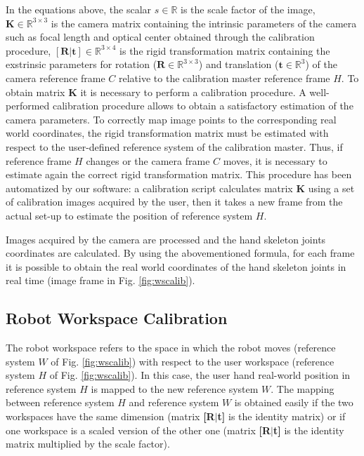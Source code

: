 \documentclass[letterpaper, 10 pt, conference]{ieeeconf}  %
\begin{document}
In the equations above, the scalar $s\in\mathbb{R}$ is the scale factor of the image, $\mathbf{K}\in\mathbb{R}^{3\times3}$ is the camera matrix containing the intrinsic parameters of the camera such as focal length and optical center obtained through the calibration procedure, $\mathbf{[R|t]}\in\mathbb{R}^{3\times4}$ is the rigid transformation matrix containing the exstrinsic parameters for rotation ($\mathbf{R}\in\mathbb{R}^{3\times3}$) and translation ($\mathbf{t}\in\mathbb{R}^3$) of the camera reference frame $C$ relative to the calibration master reference frame $H$. 
To obtain matrix \textbf{K} it is necessary to perform a calibration procedure. A well-performed calibration procedure allows to obtain a satisfactory estimation of the camera parameters. To correctly map image points to the corresponding real world coordinates, the rigid transformation matrix must be estimated with respect to the user-defined reference system of the calibration master. Thus, if reference frame $H$ changes or the camera frame $C$ moves, it is necessary to estimate again the correct rigid transformation matrix. This procedure has been automatized by our software: a calibration script calculates matrix \textbf{K} using a set of calibration images acquired by the user, then it takes a new frame from the actual set-up to estimate the position of reference system $H$.

Images acquired by the camera are processed and the hand skeleton joints coordinates are calculated. By using the abovementioned formula, for each frame it is possible to obtain the real world coordinates of the hand skeleton joints in real time (image frame in Fig. \ref{fig:wscalib}).

\subsection{Robot Workspace Calibration}
The robot workspace refers to the space in which the robot moves (reference system $W$ of Fig. \ref{fig:wscalib}) with respect to the user workspace (reference system $H$ of Fig. \ref{fig:wscalib}). In this case, the user hand real-world position in reference system $H$ is mapped to the new reference system $W$. The mapping between reference system $H$ and reference system $W$ is obtained easily if the two workspaces have the same dimension (matrix \textbf{[R$|$t]} is the identity matrix) or if one workspace is a scaled version of the other one (matrix \textbf{[R$|$t]} is the identity matrix multiplied by the scale factor). %
\end{document}
